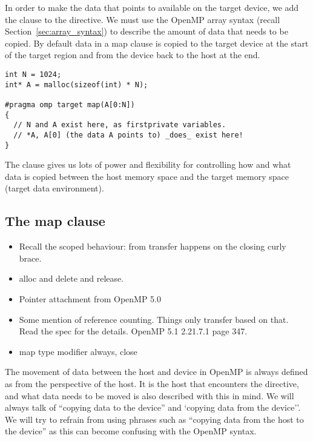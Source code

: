 In order to make the data that  points to available on the target device, we add the  clause to the  directive.
We must use the OpenMP array syntax (recall Section~\ref{sec:array_syntax}) to describe the amount of data that needs to be copied.
By default data in a map clause is copied to the target device at the start of the target region and from the device back to the host at the end.

\begin{Verbatim}
int N = 1024;
int* A = malloc(sizeof(int) * N);

#pragma omp target map(A[0:N])
{
  // N and A exist here, as firstprivate variables.
  // *A, A[0] (the data A points to) _does_ exist here!
}
\end{Verbatim}

The  clause gives us lots of power and flexibility for controlling how and what data is copied between the host memory space and the target memory space (target data environment).

\subsection{The map clause}
\label{ssec:map_clause}

\begin{itemize}
  \item Recall the scoped behaviour: from transfer happens on the closing curly brace.
  \item alloc and delete and release.
  \item Pointer attachment from OpenMP 5.0
  \item Some mention of reference counting. Things only transfer based on that. Read the spec for the details. OpenMP 5.1 2.21.7.1 page 347.
  \item map type modifier always, close
\end{itemize}

The movement of data between the host and device in OpenMP is always defined as from the perspective of the host.
It is the host that encounters the  directive, and what data needs to be moved is also described with this in mind.
We will always talk of ``copying data to the device'' and `copying data from the device''.
We will try to refrain from using phrases such as ``copying data from the host to the device'' as this can become confusing with the OpenMP syntax.

